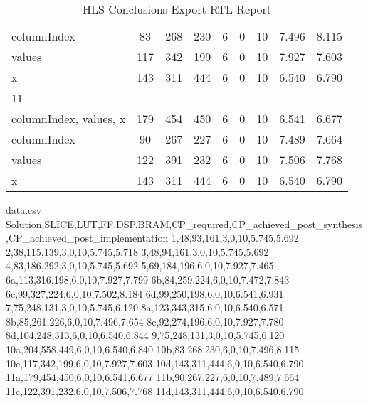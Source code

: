 \begin{table}[H]
\begin{tabular}{|l|c|c|c|c|c|c|c|c|}
		\tabitem columnIndex & 83 & 268 & 230 & 6 & 0 & 10 & 7.496 & 8.115 \\
		\tabitem values & 117 & 342 & 199 & 6 & 0 & 10 & 7.927 & 7.603 \\
		\tabitem x & 143 & 311 & 444 & 6 & 0 & 10 & 6.540 & 6.790 \\
		\hline
		11 &  &  &  &  &  &  &  &  \\
		\tabitem columnIndex, values, x & 179 & 454 & 450 & 6 & 0 & 10 & 6.541 & 6.677 \\
		\tabitem columnIndex & 90 & 267 & 227 & 6 & 0 & 10 & 7.489 & 7.664 \\
		\tabitem values & 122 & 391 & 232 & 6 & 0 & 10 & 7.506 & 7.768 \\
		\tabitem x & 143 & 311 & 444 & 6 & 0 & 10 & 6.540 & 6.790 \\
		\hline
	\end{tabular}
	\caption{HLS Conclusions Export RTL Report}
	\label{tab:hls-conclusions-export-rtl-report}
\end{table}




\begin{filecontents}{data.csv}
	Solution,SLICE,LUT,FF,DSP,BRAM,CP\_required,CP\_achieved\_post\_synthesis,CP\_achieved\_post\_implementation
	1,48,93,161,3,0,10,5.745,5.692
	2,38,115,139,3,0,10,5.745,5.718
	3,48,94,161,3,0,10,5.745,5.692
	4,83,186,292,3,0,10,5.745,5.692
	5,69,184,196,6,0,10,7.927,7.465
	6a,113,316,198,6,0,10,7.927,7.799
	6b,84,259,224,6,0,10,7.472,7.843
	6c,99,327,224,6,0,10,7.502,8.184
	6d,99,250,198,6,0,10,6.541,6.931
	7,75,248,131,3,0,10,5.745,6.120
	8a,123,343,315,6,0,10,6.540,6.571
	8b,85,261,226,6,0,10,7.496,7.654
	8c,92,274,196,6,0,10,7.927,7.780
	8d,104,248,313,6,0,10,6.540,6.844
	9,75,248,131,3,0,10,5.745,6.120
	10a,204,558,449,6,0,10,6.540,6.840
	10b,83,268,230,6,0,10,7.496,8.115
	10c,117,342,199,6,0,10,7.927,7.603
	10d,143,311,444,6,0,10,6.540,6.790
	11a,179,454,450,6,0,10,6.541,6.677
	11b,90,267,227,6,0,10,7.489,7.664
	11c,122,391,232,6,0,10,7.506,7.768
	11d,143,311,444,6,0,10,6.540,6.790
\end{filecontents}

